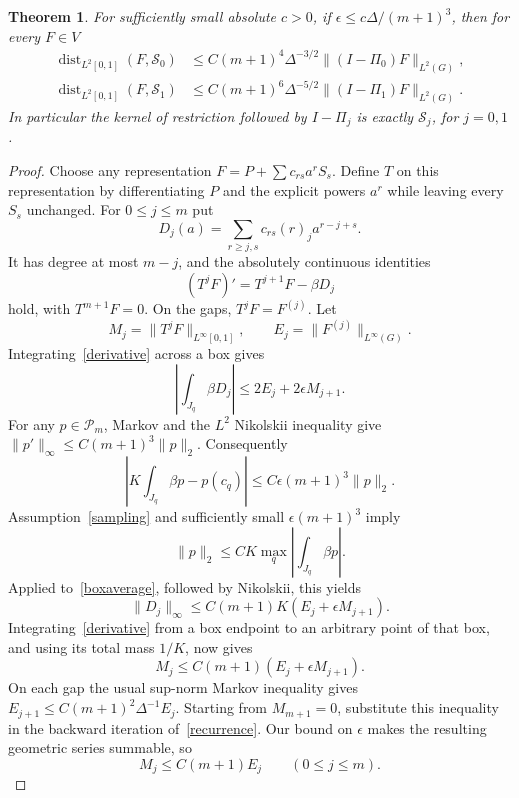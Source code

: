 \documentclass[11pt]{article}
\newtheorem{theorem}{Theorem}\newtheorem{lemma}{Lemma}\newtheorem{corollary}{Corollary}
\newcommand{\PP}{\mathcal P}
\begin{document}
\begin{theorem}\label{quotient}
For sufficiently small absolute $c>0$, if
$\epsilon\le c\Delta/(m+1)^3$, then for every $F\in V$
\begin{align}
 \operatorname{dist}_{L^2[0,1]}(F,\mathcal S_0)
  &\le C(m+1)^4\Delta^{-3/2}\|(I-\Pi_0)F\|_{L^2(G)},\label{q0}\\
 \operatorname{dist}_{L^2[0,1]}(F,\mathcal S_1)
  &\le C(m+1)^6\Delta^{-5/2}\|(I-\Pi_1)F\|_{L^2(G)}.\label{q1}
\end{align}
In particular the kernel of restriction followed by $I-\Pi_j$ is
exactly $\mathcal S_j$, for $j=0,1$.
\end{theorem}
\begin{proof}
Choose any representation $F=P+\sum c_{rs}a^rS_s$. Define $T$ on this
representation by differentiating $P$ and the explicit powers $a^r$
while leaving every $S_s$ unchanged. For $0\le j\le m$ put
\[
 D_j(a)=\sum_{r\ge j,s}c_{rs}(r)_j a^{r-j+s}.
\]
It has degree at most $m-j$, and the absolutely continuous identities
\begin{equation}\label{derivative}
 (T^jF)'=T^{j+1}F-\beta D_j
\end{equation}
hold, with $T^{m+1}F=0$. On the gaps, $T^jF=F^{(j)}$.
Let
\[
 M_j=\|T^jF\|_{L^\infty[0,1]},\qquad
 E_j=\|F^{(j)}\|_{L^\infty(G)}.
\]
Integrating~\eqref{derivative} across a box gives
\begin{equation}\label{boxaverage}
 \left|\int_{J_q}\beta D_j\right|
       \le2E_j+2\epsilon M_{j+1}.
\end{equation}
For any $p\in\PP_m$, Markov and the $L^2$ Nikolskii inequality give
$\|p'\|_\infty\le C(m+1)^3\|p\|_2$. Consequently
\[
 \left|K\int_{J_q}\beta p-p(c_q)\right|
       \le C\epsilon(m+1)^3\|p\|_2.
\]
Assumption~\eqref{sampling} and sufficiently small
$\epsilon(m+1)^3$ imply
\[
 \|p\|_2\le C K\max_q\left|\int_{J_q}\beta p\right|.
\]
Applied to~\eqref{boxaverage}, followed by Nikolskii, this yields
\[
 \|D_j\|_\infty\le C(m+1)K(E_j+\epsilon M_{j+1}).
\]
Integrating~\eqref{derivative} from a box endpoint to an arbitrary
point of that box, and using its total mass $1/K$, now gives
\begin{equation}\label{recurrence}
 M_j\le C(m+1)(E_j+\epsilon M_{j+1}).
\end{equation}
On each gap the usual sup-norm Markov inequality gives
$E_{j+1}\le C(m+1)^2\Delta^{-1}E_j$.
Starting from $M_{m+1}=0$, substitute this inequality in the backward
iteration of~\eqref{recurrence}. Our bound on $\epsilon$ makes the
resulting geometric series summable, so
\begin{equation}\label{globalderivatives}
 M_j\le C(m+1)E_j\qquad(0\le j\le m).
\end{equation}


\end{proof}
\end{document}
